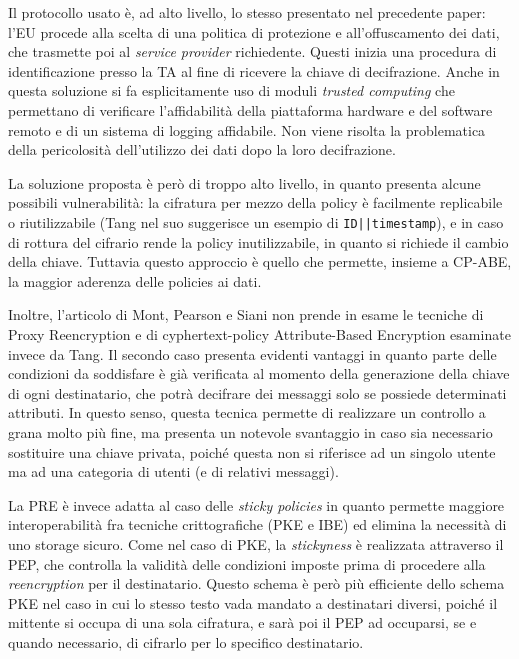 Il protocollo usato \`e, ad alto livello, lo stesso presentato nel precedente paper: l’EU procede alla scelta di una politica di protezione e all’offuscamento dei dati, che trasmette poi al \textit{service provider} richiedente. Questi inizia una procedura di identificazione presso la TA al fine di ricevere la chiave di decifrazione. Anche in questa soluzione si fa esplicitamente uso di moduli \textit{trusted computing} che permettano di verificare l’affidabilit\`a della piattaforma hardware e del software remoto e di un sistema di logging affidabile. Non viene risolta la problematica della pericolosit\`a dell’utilizzo dei dati dopo la loro decifrazione.

La soluzione proposta \`e per\`o di troppo alto livello, in quanto presenta alcune possibili vulnerabilit\`a: la cifratura per mezzo della policy \`e facilmente replicabile o riutilizzabile (Tang nel suo \cite{tang2008using} suggerisce un esempio di \texttt{ID||timestamp}), e in caso di rottura del cifrario rende la policy inutilizzabile, in quanto si richiede il cambio della chiave. Tuttavia questo approccio \`e quello che permette, insieme a CP-ABE, la maggior aderenza delle policies ai dati.

Inoltre, l’articolo di Mont, Pearson e Siani non prende in esame le tecniche di Proxy Reencryption \cite{green2007identity} e di cyphertext-policy Attribute-Based Encryption \cite{bethencourt2007ciphertext} esaminate invece da Tang. Il secondo caso presenta evidenti vantaggi in quanto parte delle condizioni da soddisfare \`e gi\`a verificata al momento della generazione della chiave di ogni destinatario, che potr\`a decifrare dei messaggi solo se possiede determinati attributi. In questo senso, questa tecnica permette di realizzare un controllo a grana molto pi\`u fine, ma presenta un notevole svantaggio in caso sia necessario sostituire una chiave privata, poich\'e questa non si riferisce ad un singolo utente ma ad una categoria di utenti (e di relativi messaggi).

La PRE \`e invece adatta al caso delle \textit{sticky policies} in quanto permette maggiore interoperabilit\`a fra tecniche crittografiche (PKE e IBE) ed elimina la necessit\`a di uno storage sicuro. Come nel caso di PKE, la \textit{stickyness} \`e realizzata attraverso il PEP, che controlla la validit\`a delle condizioni imposte prima di procedere alla \textit{reencryption} per il destinatario. Questo schema \`e per\`o pi\`u efficiente dello schema PKE nel caso in cui lo stesso testo vada mandato a destinatari diversi, poich\'e il mittente si occupa di una sola cifratura, e sar\`a poi il PEP ad occuparsi, se e quando necessario, di cifrarlo per lo specifico destinatario.

